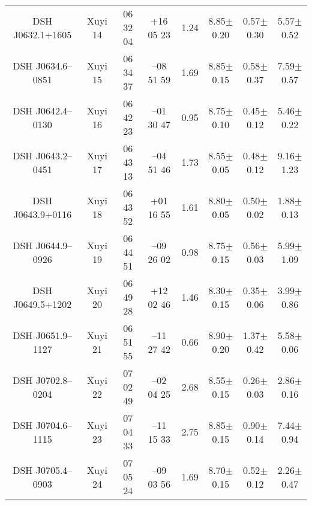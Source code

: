\documentclass[]{raa_rb}
\begin{document}
\begin{table*}
\begin{minipage}{140mm}
\begin{tabular}{c|c|c|c|c|c|c|c}
DSH J0632.1+1605  & Xuyi 14     & 06 32 04 &  +16 05 23 & 1.24 & 8.85$\pm$0.20 & 0.57$\pm$0.30 &  5.57$\pm$0.52  \\
DSH J0634.6--0851 & Xuyi 15     & 06 34 37 & --08 51 59 & 1.69 & 8.85$\pm$0.15 & 0.58$\pm$0.37 &  7.59$\pm$0.57  \\
DSH J0642.4--0130 & Xuyi 16     & 06 42 23 & --01 30 47 & 0.95 & 8.75$\pm$0.10 & 0.45$\pm$0.12 &  5.46$\pm$0.22  \\
DSH J0643.2--0451 & Xuyi 17     & 06 43 13 & --04 51 46 & 1.73 & 8.55$\pm$0.05 & 0.48$\pm$0.12 &  9.16$\pm$1.23  \\
DSH J0643.9+0116  & Xuyi 18     & 06 43 52 &  +01 16 55 & 1.61 & 8.80$\pm$0.05 & 0.50$\pm$0.02 &  1.88$\pm$0.13  \\
DSH J0644.9--0926 & Xuyi 19     & 06 44 51 & --09 26 02 & 0.98 & 8.75$\pm$0.15 & 0.56$\pm$0.03 &  5.99$\pm$1.09  \\
DSH J0649.5+1202  & Xuyi 20     & 06 49 28 &  +12 02 46 & 1.46 & 8.30$\pm$0.15 & 0.35$\pm$0.06 &  3.99$\pm$0.86  \\
DSH J0651.9--1127 & Xuyi 21     & 06 51 55 & --11 27 42 & 0.66 & 8.90$\pm$0.20 & 1.37$\pm$0.42 &  5.58$\pm$0.06  \\
DSH J0702.8--0204 & Xuyi 22     & 07 02 49 & --02 04 25 & 2.68 & 8.55$\pm$0.15 & 0.26$\pm$0.03 &  2.86$\pm$0.16  \\
DSH J0704.6--1115 & Xuyi 23     & 07 04 33 & --11 15 33 & 2.75 & 8.85$\pm$0.15 & 0.90$\pm$0.14 &  7.44$\pm$0.94  \\
DSH J0705.4--0903 & Xuyi 24     & 07 05 24 & --09 03 56 & 1.69 & 8.70$\pm$0.15 & 0.52$\pm$0.12 &  2.26$\pm$0.47  \\
\hline
\end{tabular}
\end{minipage}
\end{table*}
\end{document}
